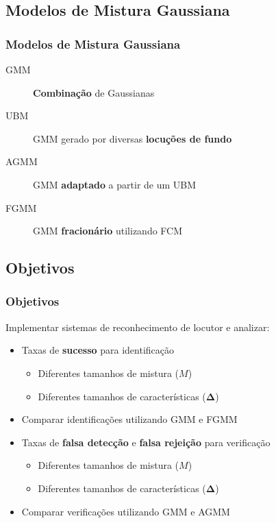 \subsection{Modelos de Mistura Gaussiana}

\begin{frame}
\frametitle{Modelos de Mistura Gaussiana}
\begin{description}
    \item[GMM] \textbf{Combinação} de Gaussianas
    \item[UBM] GMM gerado por diversas \textbf{locuções de fundo}
    \item[AGMM] GMM \textbf{adaptado} a partir de um UBM
    \item[FGMM] GMM \textbf{fracionário} utilizando FCM
\end{description}
\end{frame}

\subsection{Objetivos}

\begin{frame}
\frametitle{Objetivos}
\begin{description}
    \item Implementar sistemas de reconhecimento de locutor e analizar:
    \pause
    \begin{itemize}
        \item Taxas de \textbf{sucesso} para identificação
        \pause
        \begin{itemize}
            \item Diferentes tamanhos de mistura ($M$)
            \item Diferentes tamanhos de características ($\boldsymbol{\Delta}$)
            \pause
        \end{itemize}
        \item Comparar identificações utilizando GMM e FGMM
        \pause
        \item Taxas de \textbf{falsa detecção} e \textbf{falsa rejeição} para verificação
        \pause
        \begin{itemize}
            \item Diferentes tamanhos de mistura ($M$)
            \item Diferentes tamanhos de características ($\boldsymbol{\Delta}$)
            \pause
        \end{itemize}
        \item Comparar verificações utilizando GMM e AGMM
    \end{itemize}
\end{description}
\end{frame}